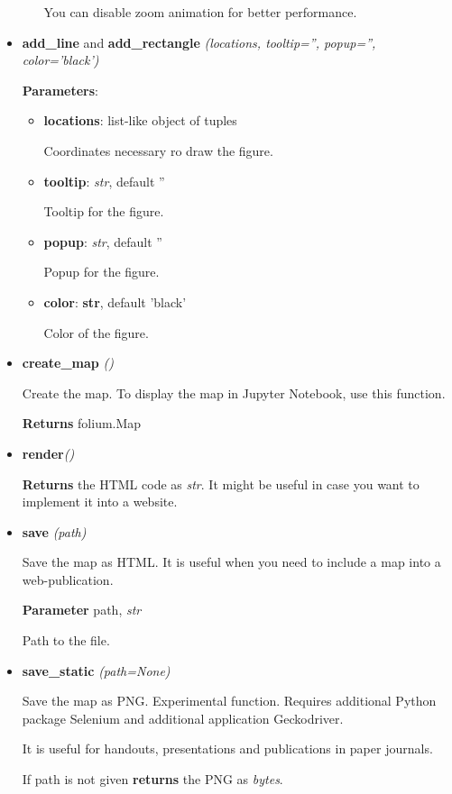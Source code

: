 \documentclass[a4paper,12pt]{article}
\begin{document}
\begin{itemize}
\begin{itemize}
  You can disable zoom animation for better performance.
 
 \end{itemize}
 
 \item \textbf{add\_line} and \textbf{add\_rectangle} \textit{(locations, tooltip='', popup='', color='black')}
 
 \textbf{Parameters}:
 \begin{itemize}
  \item \textbf{locations}: list-like object of tuples
  
  Coordinates necessary ro draw the figure.
  
  \item \textbf{tooltip}: \textit{str}, default ''
  
  Tooltip for the figure.
  
  \item \textbf{popup}: \textit{str}, default ''
  
  Popup for the figure.
  
  \item \textbf{color}: \textbf{str}, default 'black'
  
  Color of the figure.
  
 \end{itemize}

 
 \item \textbf{create\_map} \textit{()}
 
 Create the map. To display the map in Jupyter Notebook, use this function.
 
 \textbf{Returns} folium.Map
 
 \item \textbf{render}\textit{()}
 
 \textbf{Returns} the HTML code as \textit{str}. It might be useful in case you want to implement it into a website.
 
 \item \textbf{save} \textit{(path)}
 
 Save the map as HTML. It is useful when you need to include a map into a web-publication.
 
 \textbf{Parameter} path, \textit{str}
 
 Path to the file.
 
 \item \textbf{save\_static} \textit{(path=None)}
 
 Save the map as PNG. Experimental function. Requires additional Python package Selenium and additional application Geckodriver.
 
 It is useful for handouts, presentations and publications in paper journals.
 
 If path is not given \textbf{returns} the PNG as \textit{bytes}.

\end{itemize}
\end{document}
